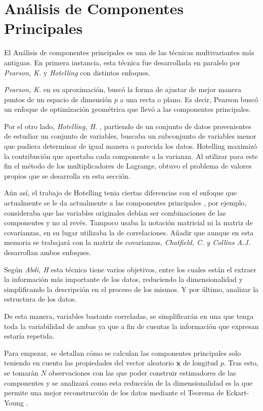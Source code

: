 \newpage
\section{Análisis de Componentes Principales}
\noindent El Análisis de componentes principales es una de las técnicas multivariantes más antiguas. En primera instancia, esta técnica fue desarrollada en paralelo por \emph{Pearson, K.} \cite{Pearson 1901} y \emph{Hotelling} \cite{Hotelling 1933} con distintos enfoques. 

\noindent \emph{Pearson, K.}\cite{Pearson 1901} en su aproximación, buscó la forma de ajustar de mejor manera puntos de un espacio de dimensión $p$ a una recta o plano. Es decir, Pearson buscó un enfoque de optimización geométrica que llevó a las componentes principales.

\noindent Por el otro lado, \emph{Hotelling, H.} \cite{Hotelling 1933}, partiendo de un conjunto de datos provenientes de estudiar un conjunto de variables,  buscaba un subconjunto de variables menor que pudiera determinar de igual manera o parecida los datos. Hotelling maximizó la contribución que aportaba cada componente a la varianza. Al utilizar para este fin el método de los multiplicadores de Lagrange, obtuvo el problema de valores propios que se desarrolla en esta sección. 

\noindent Aún así, el trabajo de Hotelling tenia ciertas diferencias con el enfoque que actualmente se le da actualmente a las componentes principales \cite{Jollife 1986}, por ejemplo, consideraba que las variables originales  debían ser combinaciones de las componentes y no al revés. Tampoco usaba la notación matricial ni la matriz de covarianzas, en su lugar utilizaba la de correlaciones. Añadir que aunque en esta memoria se trabajará con la matriz de covarianzas, \emph{Chatfield, C. y Collins A.J.}\cite{Chatfield 1989} desarrollan ambos enfoques. 

\noindent Según \emph{Abdi, H} \cite{Abdi 2010} esta técnica tiene varios objetivos, entre los cuales están el extraer la información más importante de los datos, reduciendo la dimensionalidad y simplificando la descripción en el proceso de los mismos. Y por último, analizar la estructura de los datos. 


\noindent De esta manera, variables bastante correladas, se simplificarán en una que tenga toda la variabilidad de ambas \cite{Chatfield 1989, Everitt 2011} ya que a fin de cuentas la información que expresan estaría repetida. 

\noindent Para empezar, se detallan cómo se calculan las componentes principales solo teniendo en cuenta las propiedades del vector aleatorio $\mathbf{x}$ de longitud $p$. Tras esto, se tomarán $N$ observaciones con las que poder construir estimadores de las componentes y se analizará como esta reducción de la dimensionalidad es la que permite una mejor reconstrucción de los datos mediante el Teorema de Eckart-Young \cite{Eckart 1936}. 

